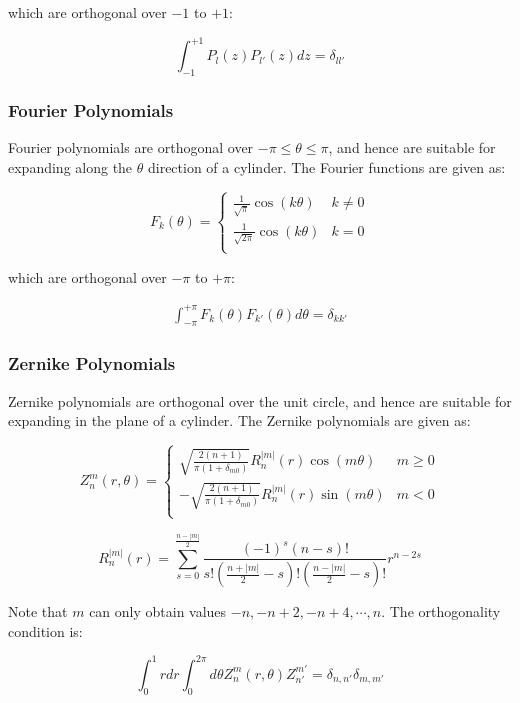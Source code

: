 \documentclass[10pt]{article}
\newcommand{\beq}{\begin{equation}}
\newcommand{\eeq}{\end{equation}}
\newcommand{\beqa}{\begin{equation}\begin{aligned}}
\newcommand{\eeqa}{\end{aligned}\end{equation}}
\numberwithin{equation}{section} %
\begin{document}
which are orthogonal over \(-1\) to \(+1\):

\beq
\label{eq:LegendreScaledOrthogonality}
\int_{-1}^{+1}P_l(z)P_{l'}(z)dz=\delta_{ll'}
\eeq

\subsubsection{Fourier Polynomials}

Fourier polynomials are orthogonal over \(-\pi\leq\theta\leq\pi\), and hence are suitable for expanding along the \(\theta\) direction of a cylinder. The Fourier functions are given as:

\beq
\label{eq:FourierScaled}
F_k(\theta)=
\begin{cases}
\frac{1}{\sqrt{\pi}}\cos{(k\theta)} & k \neq 0\\
\frac{1}{\sqrt{2\pi}}\cos{(k\theta)} & k = 0\\
\end{cases}
\eeq

which are orthogonal over \(-\pi\) to \(+\pi\):

\beqa
\label{eq:FourierOrthogonal}
\int_{-\pi}^{+\pi}F_k(\theta)F_{k'}(\theta)d\theta=\delta_{kk'}
\eeqa

\subsubsection{Zernike Polynomials}

Zernike polynomials are orthogonal over the unit circle, and hence are suitable for expanding in the plane of a cylinder. The Zernike polynomials are given as:

\beq
\label{eq:ZernikeScaled}
Z_n^m(r,\theta)=
\begin{cases}
\sqrt{\frac{2(n+1)}{\pi\left(1+\delta_{m0}\right)}}R_n^{|m|}(r)\cos{(m\theta)} & m\geq 0\\
-\sqrt{\frac{2(n+1)}{\pi\left(1+\delta_{m0}\right)}}R_n^{|m|}(r)\sin{(m\theta)} & m < 0\\
\end{cases}
\eeq

\beq
R_n^{|m|}(r)=\sum_{s=0}^{\frac{n-|m|}{2}}\frac{(-1)^s(n-s)!}{s!\left(\frac{n+|m|}{2}-s\right)!\left(\frac{n-|m|}{2}-s\right)!}r^{n-2s}
\eeq

Note that \(m\) can only obtain values \(-n, -n+2, -n+4, \cdots, n\). The orthogonality condition is:

\beq
\label{eq:ZernikeOrthogonal}
\int_{0}^{1}rdr\int_{0}^{2\pi}d\theta Z_{n}^m(r,\theta)Z_{n'}^{m'}=\delta_{n,n'}\delta_{m,m'}
\eeq
\end{document}
